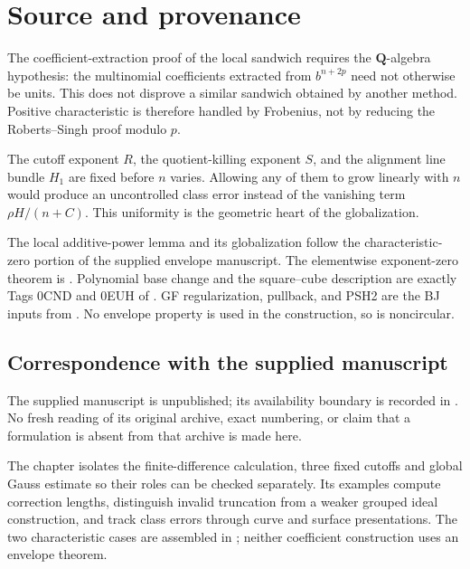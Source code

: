 \section{Source and provenance}
\label{sec:ch44-source-note}

The coefficient-extraction proof of the local sandwich requires the
$\mathbf Q$-algebra hypothesis: the multinomial coefficients extracted
from $b^{n+2p}$ need not otherwise be units.  This does not disprove
a similar sandwich obtained by another method.
Positive characteristic is therefore handled by Frobenius, not by reducing
the Roberts--Singh proof modulo $p$.

The cutoff exponent $R$, the quotient-killing exponent $S$, and the
alignment line bundle $H_1$ are fixed before $n$ varies.
Allowing any of them to grow linearly with $n$ would produce an uncontrolled
class error instead of the vanishing term
$\rho H/(n+C)$.
This uniformity is the geometric heart of the globalization.

The local additive-power lemma and its globalization follow the
characteristic-zero portion of the supplied envelope manuscript.
The elementwise exponent-zero theorem is
\cite[Theorem~4.17, Proposition~4.2, and Corollary~4.3]{RobertsSingh}.
Polynomial base change and the square--cube description are exactly Tags
0CND and 0EUH of \cite{stacks-project}.
GF regularization, pullback, and PSH2 are the BJ inputs from \cite{BJ22}.
No envelope property is used in the construction, so
 is noncircular.

\subsection{Correspondence with the supplied manuscript}
\label{sec:ch44-correspondence}

The supplied manuscript is unpublished; its availability boundary is
recorded in .  No fresh reading of its original
archive, exact numbering, or claim that a formulation is absent from that
archive is made here.

The chapter isolates the finite-difference calculation, three fixed
cutoffs and global Gauss estimate so their roles can be checked separately.
Its examples compute correction lengths, distinguish invalid truncation
from a weaker grouped ideal construction, and track class errors through
curve and surface presentations.  The two characteristic cases are
assembled in ;
neither coefficient construction uses an envelope theorem.

